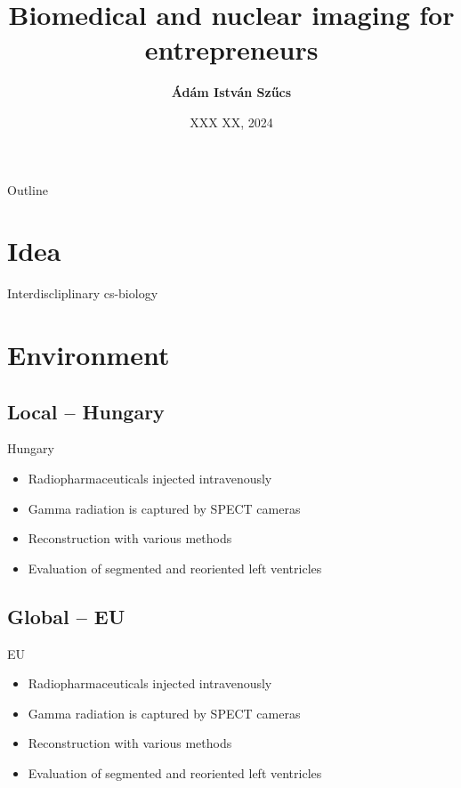 \documentclass[aspectratio=169]{beamer}
\title{Biomedical and nuclear imaging for entrepreneurs}
\author{ 
    \textbf{Ádám István Szűcs}
}
\date{XXX XX, 2024}
\begin{document}
\begin{frame}
    \titlepage 
\end{frame}

\begin{frame}{Outline}
    \tableofcontents
\end{frame}

\section{Idea}
\begin{frame}{Interdiscliplinary cs-biology}
    
\end{frame}
\section{Environment}
\subsection{Local -- Hungary}
\begin{frame}{Hungary}
    \begin{itemize}
        \item<1-> Radiopharmaceuticals injected intravenously
        \item<2-> Gamma radiation is captured by SPECT cameras
        \item<3-> Reconstruction with various methods
        \item<4-> Evaluation of segmented and reoriented left ventricles
    \end{itemize}
\end{frame}

\subsection{Global -- EU}
\begin{frame}{EU}
    \begin{itemize}
        \item<1-> Radiopharmaceuticals injected intravenously
        \item<2-> Gamma radiation is captured by SPECT cameras
        \item<3-> Reconstruction with various methods
        \item<4-> Evaluation of segmented and reoriented left ventricles
    \end{itemize}
\end{frame}
\end{document}
